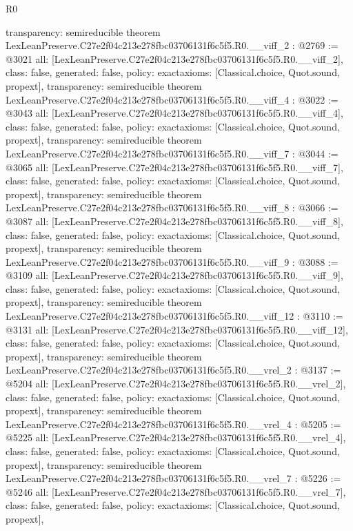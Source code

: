 \begin{lexlean}{R0}
\begin{coremodule}
{  transparency: semireducible
}
theorem LexLeanPreserve.C27e2f04c213e278fbc03706131f6c5f5.R0.__viff_2 : @2769 := @3021 {
  all: [LexLeanPreserve.C27e2f04c213e278fbc03706131f6c5f5.R0.__viff_2],
  class: false,
  generated: false,
  policy: exact{axioms: [Classical.choice, Quot.sound, propext]},
  transparency: semireducible
}
theorem LexLeanPreserve.C27e2f04c213e278fbc03706131f6c5f5.R0.__viff_4 : @3022 := @3043 {
  all: [LexLeanPreserve.C27e2f04c213e278fbc03706131f6c5f5.R0.__viff_4],
  class: false,
  generated: false,
  policy: exact{axioms: [Classical.choice, Quot.sound, propext]},
  transparency: semireducible
}
theorem LexLeanPreserve.C27e2f04c213e278fbc03706131f6c5f5.R0.__viff_7 : @3044 := @3065 {
  all: [LexLeanPreserve.C27e2f04c213e278fbc03706131f6c5f5.R0.__viff_7],
  class: false,
  generated: false,
  policy: exact{axioms: [Classical.choice, Quot.sound, propext]},
  transparency: semireducible
}
theorem LexLeanPreserve.C27e2f04c213e278fbc03706131f6c5f5.R0.__viff_8 : @3066 := @3087 {
  all: [LexLeanPreserve.C27e2f04c213e278fbc03706131f6c5f5.R0.__viff_8],
  class: false,
  generated: false,
  policy: exact{axioms: [Classical.choice, Quot.sound, propext]},
  transparency: semireducible
}
theorem LexLeanPreserve.C27e2f04c213e278fbc03706131f6c5f5.R0.__viff_9 : @3088 := @3109 {
  all: [LexLeanPreserve.C27e2f04c213e278fbc03706131f6c5f5.R0.__viff_9],
  class: false,
  generated: false,
  policy: exact{axioms: [Classical.choice, Quot.sound, propext]},
  transparency: semireducible
}
theorem LexLeanPreserve.C27e2f04c213e278fbc03706131f6c5f5.R0.__viff_12 : @3110 := @3131 {
  all: [LexLeanPreserve.C27e2f04c213e278fbc03706131f6c5f5.R0.__viff_12],
  class: false,
  generated: false,
  policy: exact{axioms: [Classical.choice, Quot.sound, propext]},
  transparency: semireducible
}
theorem LexLeanPreserve.C27e2f04c213e278fbc03706131f6c5f5.R0.__vrel_2 : @3137 := @5204 {
  all: [LexLeanPreserve.C27e2f04c213e278fbc03706131f6c5f5.R0.__vrel_2],
  class: false,
  generated: false,
  policy: exact{axioms: [Classical.choice, Quot.sound, propext]},
  transparency: semireducible
}
theorem LexLeanPreserve.C27e2f04c213e278fbc03706131f6c5f5.R0.__vrel_4 : @5205 := @5225 {
  all: [LexLeanPreserve.C27e2f04c213e278fbc03706131f6c5f5.R0.__vrel_4],
  class: false,
  generated: false,
  policy: exact{axioms: [Classical.choice, Quot.sound, propext]},
  transparency: semireducible
}
theorem LexLeanPreserve.C27e2f04c213e278fbc03706131f6c5f5.R0.__vrel_7 : @5226 := @5246 {
  all: [LexLeanPreserve.C27e2f04c213e278fbc03706131f6c5f5.R0.__vrel_7],
  class: false,
  generated: false,
  policy: exact{axioms: [Classical.choice, Quot.sound, propext]},
}
\end{coremodule}
\end{lexlean}
